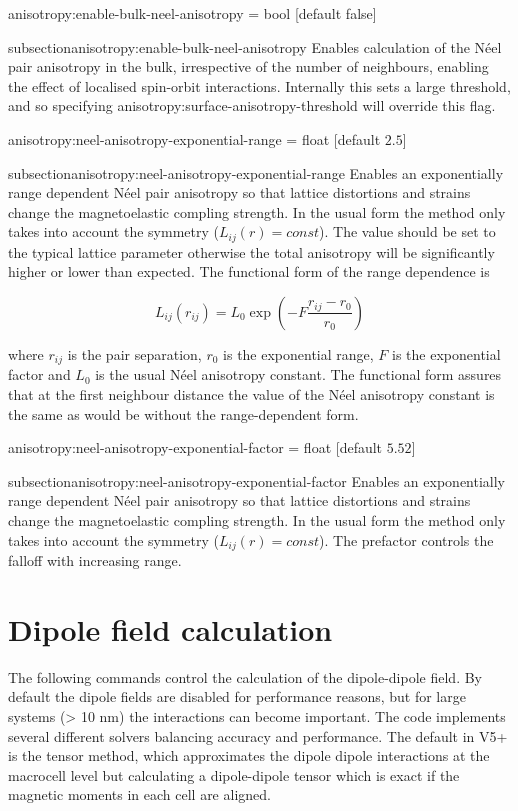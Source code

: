 {\zicf anisotropy:enable-bulk-neel-anisotropy = bool [default false]}
{subsection}{anisotropy:enable-bulk-neel-anisotropy} Enables calculation of the N\'eel pair anisotropy in the bulk, irrespective of the number of neighbours, enabling the effect of localised spin-orbit interactions. Internally this sets a large threshold, and so specifying anisotropy:surface-anisotropy-threshold will override this flag.

{\zicf anisotropy:neel-anisotropy-exponential-range = float [default $2.5$]}
{subsection}{anisotropy:neel-anisotropy-exponential-range} Enables an exponentially range dependent N\'eel pair anisotropy so that lattice distortions and strains change the magnetoelastic compling strength. In the usual form the method only takes into account the symmetry ($L_{ij}(r) = const$). The value should be set to the typical lattice parameter otherwise the total anisotropy will be significantly higher or lower than expected. The functional form of the range dependence is

\begin{equation}
   L_{ij}(r_{ij}) = L_0 \exp\left(-F\frac{r_{ij} - r_0}{r_{0}}\right)
\end{equation}

\noindent where $r_{ij}$ is the pair separation, $r_0$ is the exponential range, $F$ is the exponential factor and $L_0$ is the usual N\'eel anisotropy constant. The functional form assures that at the first neighbour distance the value of the N\'eel anisotropy constant is the same as would be without the range-dependent form.

{\zicf anisotropy:neel-anisotropy-exponential-factor = float [default $5.52$]}
{subsection}{anisotropy:neel-anisotropy-exponential-factor} Enables an exponentially range dependent N\'eel pair anisotropy so that lattice distortions and strains change the magnetoelastic compling strength. In the usual form the method only takes into account the symmetry ($L_{ij}(r)
= const$). The prefactor controls the falloff with increasing range.

\section*{Dipole field calculation}
The following commands control the calculation of the dipole-dipole field. By default the dipole fields are disabled for performance reasons, but for large systems (> 10 nm) the interactions can become important. The \vampire code implements several different solvers balancing accuracy and performance. The default in V5+ is the tensor method, which approximates the dipole dipole interactions at the macrocell level but calculating a dipole-dipole tensor which is exact if the magnetic moments in each cell are aligned.

